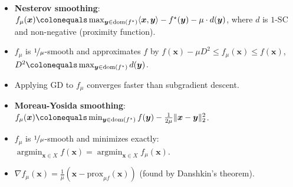 \documentclass[8pt,a4paper]{extarticle}
\DeclareMathOperator*{\argmin}{argmin}
\renewcommand{\vec}[1]{\bm{#1}}
\newcommand{\dom}[1]{\mathrm{dom}(#1)}
\newenvironment{topic}[1]
{\textbf{\sffamily \colorbox{black}{\rlap{\textbf{\textcolor{white}{#1}}}\hspace{\linewidth}\hspace{-2\fboxsep}}} \\ \vspace{0.2cm}}
{}
\begin{document}
\begin{multicols*}{2}
    \begin{topic}{Smoothing}
        \begin{itemize}
            \item \textbf{Nesterov smoothing}: $f_{\mu}(\vec{x}) \colonequals \max_{\vec{y} \in \dom{f^\star}} \langle \vec{x}, \vec{y} \rangle - f^\star(\vec{y}) - \mu \cdot d(\vec{y})$, where $d$ is $1$-SC and non-negative (proximity function).
            \item $f_{\mu}$ is $\nicefrac{1}{\mu}$-smooth and approximates $f$ by $f(\vec{x}) - \mu D^2 \leq f_{\mu}(\vec{x}) \leq f(\vec{x})$, $D^2 \colonequals \max_{\vec{y} \in \dom{f^\star}} d(\vec{y})$.
            \item Applying GD to $f_{\mu}$ converges faster than subgradient descent.
            \item \textbf{Moreau-Yosida smoothing}: $f_{\mu}(\vec{x}) \colonequals \min_{\vec{y} \in \dom{f^\star}} f(\vec{y}) - \frac{1}{2 \mu} \| \vec{x} - \vec{y} \|_2^2$.
            \item $f_{\mu}$ is $\nicefrac{1}{\mu}$-smooth and minimizes exactly: $\argmin_{\vec{x} \in X} f(\vec{x}) = \argmin_{\vec{x} \in X} f_{\mu}(\vec{x})$.
            \item $\nabla f_{\mu}(\vec{x}) = \frac{1}{\mu}(\vec{x} - \mathrm{prox}_{\mu f}(\vec{x}))$ (found by Danshkin's theorem).
        \end{itemize}
    \end{topic}


\end{multicols*}
\end{document}
